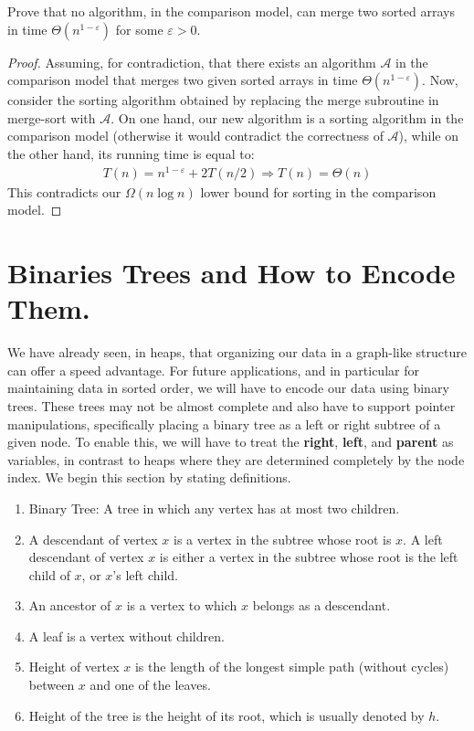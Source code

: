 \begin{example}
  Prove that no algorithm, in the comparison model, can merge two sorted arrays in time $\Theta(n^{1-\varepsilon})$ for some $\varepsilon>0$.
\end{example}
\begin{proof}
 Assuming, for contradiction, that there exists an algorithm $\mathcal{A}$ in the comparison model that merges two given sorted arrays in time $\Theta\left( n^{1-\varepsilon} \right)$. Now, consider the sorting algorithm obtained by replacing the merge subroutine in merge-sort with $\mathcal{A}$. On one hand, our new algorithm is a sorting algorithm in the comparison model (otherwise it would contradict the correctness of $\mathcal{A}$), while on the other hand, its running time is equal to:
  \begin{equation*}
    \begin{split}
      T(n) = n^{1-\varepsilon} + 2T(n/2) \Rightarrow T(n) = \Theta(n)
    \end{split}
  \end{equation*}
  This contradicts our $\Omega(n\log n)$ lower bound for sorting in the comparison model.
\end{proof}

\newpage

\section{Binaries Trees and How to Encode Them. } We have already seen, in heaps, that organizing our data in a graph-like structure can offer a speed advantage. For future applications, and in particular for maintaining data in sorted order, we will have to encode our data using binary trees. These trees may not be almost complete and also have to support pointer manipulations, specifically placing a binary tree as a left or right subtree of a given node. To enable this, we will have to treat the \textbf{right}, \textbf{left}, and \textbf{parent} as variables, in contrast to heaps where they are determined completely by the node index. We begin this section by stating definitions.


\begin{definition}
  \begin{enumerate}
    \item Binary Tree: A tree in which any vertex has at most two children.
    \item A descendant of vertex $x$ is a vertex in the subtree whose root is $x$. A left descendant of vertex $x$ is either a vertex in the subtree whose root is the left child of $x$, or $x$'s left child.
    \item An ancestor of $x$ is a vertex to which $x$ belongs as a descendant.
    \item A leaf is a vertex without children.
    \item Height of vertex $x$ is the length of the longest simple path (without cycles) between $x$ and one of the leaves.
    \item Height of the tree is the height of its root, which is usually denoted by $h$.
\end{enumerate}
\end{definition}

